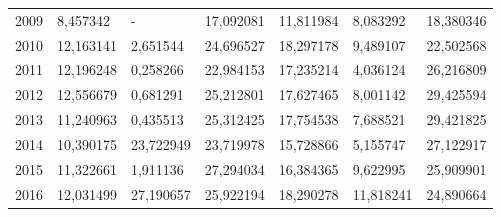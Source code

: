 \begin{table}
\begin{tabular}{p{1cm}p{2cm}p{2cm}p{2cm}p{2cm}p{2cm}p{2cm}}
 2009 &                         8,457342 &                                      - &                       17,092081 &                                  11,811984 &  8,083292 &          18,380346 \\
 2010 &                        12,163141 &                               2,651544 &                       24,696527 &                                  18,297178 &  9,489107 &          22,502568 \\
 2011 &                        12,196248 &                               0,258266 &                       22,984153 &                                  17,235214 &  4,036124 &          26,216809 \\
 2012 &                        12,556679 &                               0,681291 &                       25,212801 &                                  17,627465 &  8,001142 &          29,425594 \\
 2013 &                        11,240963 &                               0,435513 &                       25,312425 &                                  17,754538 &  7,688521 &          29,421825 \\
 2014 &                        10,390175 &                              23,722949 &                       23,719978 &                                  15,728866 &  5,155747 &          27,122917 \\
 2015 &                        11,322661 &                               1,911136 &                       27,294034 &                                  16,384365 &  9,622995 &          25,909901 \\
 2016 &                        12,031499 &                              27,190657 &                       25,922194 &                                  18,290278 & 11,818241 &          24,890664 \\
\bottomrule
\end{tabular}
\end{table}
